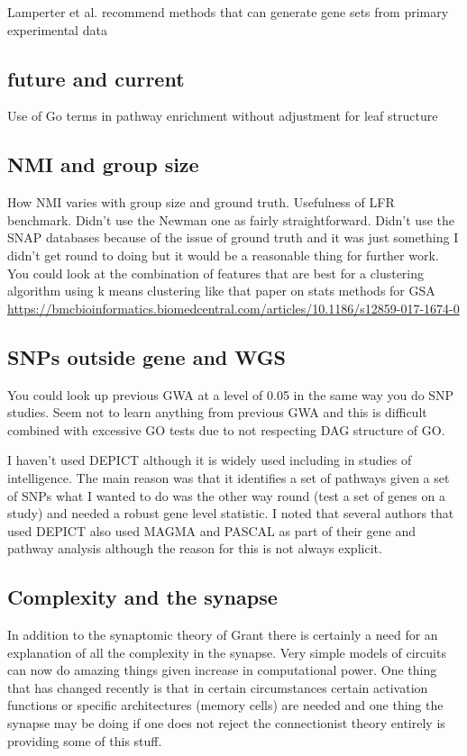  Lamperter et al. \cite{lamparter2016fast} recommend methods that can generate gene sets from primary experimental data \cite{lamparter2016fast}
 
 
 \subsection{future and current}
 Use of Go terms in pathway enrichment without adjustment for leaf structure
 
 \subsection{NMI and group size}
 How NMI varies with group size and ground truth. Usefulness of LFR benchmark. Didn't use the Newman one as fairly straightforward. Didn't use the SNAP databases because of the issue of ground truth and it was just something I didn't get round to doing but it would be a reasonable thing for further work. 
 You could look at the combination of features that are best for a clustering algorithm using k means clustering like that paper on stats methods for GSA \url{https://bmcbioinformatics.biomedcentral.com/articles/10.1186/s12859-017-1674-0}
 \subsection{SNPs outside gene and WGS}
 
 
 
 
 
 You could look up previous GWA at a level of 0.05 in the same way you do SNP studies. Seem not to learn anything from previous GWA and this is difficult combined with excessive GO tests due to not respecting DAG structure of GO.
 
 I haven't used DEPICT although it is widely used including in studies of intelligence. The main reason was that it identifies a set of pathways given a set of SNPs what I wanted to do was the other way round (test a set of genes on a study) and needed a robust gene level statistic. I noted that several authors that used DEPICT also used MAGMA and PASCAL as part of their gene and pathway analysis although the reason for this is not always explicit. 
 
 
 \subsection{Complexity and the synapse}
 In addition to the synaptomic theory of Grant there is certainly a need for an explanation of all the complexity in the synapse. Very simple models of circuits can now do amazing things given increase in computational power. One thing that has changed recently is that in certain circumstances certain activation functions or specific architectures (memory cells) are needed and one thing the synapse may be doing if one does not reject the connectionist theory entirely is providing some of this stuff. 
 
